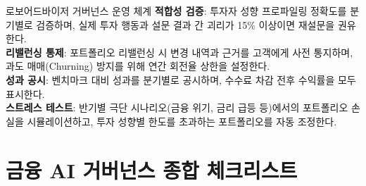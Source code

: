 \begin{practicaltool}{로보어드바이저 거버넌스 운영 체계}
\textbf{적합성 검증}: 투자자 성향 프로파일링 정확도를 분기별로 검증하며, 실제 투자 행동과 설문 결과 간 괴리가 15\% 이상이면 재설문을 권유한다.\\
\textbf{리밸런싱 통제}: 포트폴리오 리밸런싱 시 변경 내역과 근거를 고객에게 사전 통지하며, 과도 매매(Churning) 방지를 위해 연간 회전율 상한을 설정한다.\\
\textbf{성과 공시}: 벤치마크 대비 성과를 분기별로 공시하며, 수수료 차감 전후 수익률을 모두 표시한다.\\
\textbf{스트레스 테스트}: 반기별 극단 시나리오(금융 위기, 금리 급등 등)에서의 포트폴리오 손실을 시뮬레이션하고, 투자 성향별 한도를 초과하는 포트폴리오를 자동 조정한다.
\end{practicaltool}

\section{금융 AI 거버넌스 종합 체크리스트}
\label{sec:17.5}

